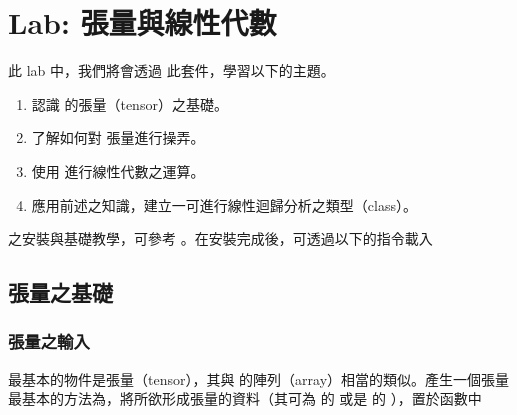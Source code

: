 \documentclass[letterpaper,10pt,english]{sphinxmanual}
\begin{document}
\chapter{Lab: 張量與線性代數}
\label{\detokenize{notebook/lab-torch-tensor:lab}}\label{\detokenize{notebook/lab-torch-tensor::doc}}
此 lab 中，我們將會透過  此套件，學習以下的主題。
\begin{enumerate}
%
\item {} 
認識  的張量（tensor）之基礎。

\item {} 
了解如何對  張量進行操弄。

\item {} 
使用  進行線性代數之運算。

\item {} 
應用前述之知識，建立一可進行線性迴歸分析之類型（class）。

\end{enumerate}

之安裝與基礎教學，可參考 。在安裝完成後，可透過以下的指令載入

\begin{sphinxVerbatim}[commandchars=\\\{\}]
 
\end{sphinxVerbatim}


\section{張量之基礎}
\label{\detokenize{notebook/lab-torch-tensor:id1}}

\subsection{張量之輸入}
\label{\detokenize{notebook/lab-torch-tensor:id2}}
 最基本的物件是張量（tensor），其與  的陣列（array）相當的類似。產生一個張量最基本的方法為，將所欲形成張量的資料（其可為  的  或是  的 ），置於函數中
\end{document}
